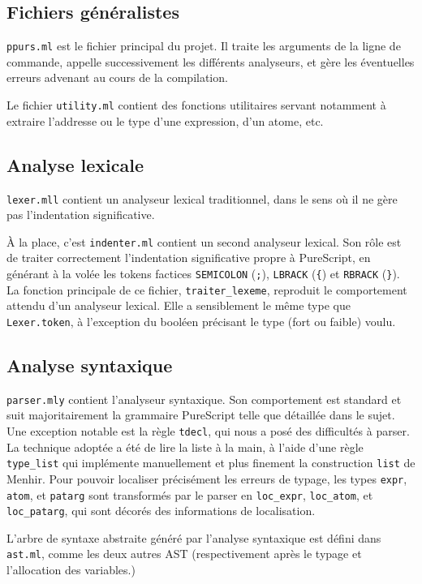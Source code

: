 \documentclass[12pt,a4paper]{article}
\begin{document}
\subsection{Fichiers généralistes}
\texttt{ppurs.ml} est le fichier principal du projet. Il traite les arguments de la ligne de commande, appelle successivement les différents analyseurs, et gère les éventuelles erreurs advenant au cours de la compilation.

Le fichier \texttt{utility.ml} contient des fonctions utilitaires servant notamment à extraire l'addresse ou le type d'une expression, d'un atome, etc.

\subsection{Analyse lexicale}
\texttt{lexer.mll} contient un analyseur lexical traditionnel, dans le sens où il ne gère pas l'indentation significative. 

À la place, c'est \texttt{indenter.ml} contient un second analyseur lexical. 
Son rôle est de traiter correctement l'indentation significative propre à PureScript, en générant à la volée les tokens factices \texttt{SEMICOLON} (\texttt{;}), \texttt{LBRACK} (\texttt{\{}) et \texttt{RBRACK} (\texttt{\}}). 
La fonction principale de ce fichier, \texttt{traiter\_lexeme}, reproduit le comportement attendu d'un analyseur lexical.
Elle a sensiblement le même type que \texttt{Lexer.token}, à l'exception du booléen précisant le type (fort ou faible) voulu.

\subsection{Analyse syntaxique}
\texttt{parser.mly} contient l'analyseur syntaxique. Son comportement est standard et suit majoritairement la grammaire PureScript telle que détaillée dans le sujet. Une exception notable est la règle \texttt{tdecl}, qui nous a posé des difficultés à parser. La technique adoptée a été de lire la liste à la main, à l'aide d'une règle \texttt{type\_list} qui implémente manuellement et plus finement la construction \texttt{list} de Menhir. Pour pouvoir localiser précisément les erreurs de typage, les types \texttt{expr}, \texttt{atom}, et \texttt{patarg} sont transformés par le parser en \texttt{loc\_expr}, \texttt{loc\_atom}, et \texttt{loc\_patarg}, qui sont décorés des informations de localisation.

L'arbre de syntaxe abstraite généré par l'analyse syntaxique est défini dans \texttt{ast.ml}, comme les deux autres AST (respectivement après le typage et l'allocation des variables.)
\end{document}
